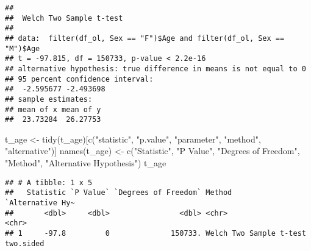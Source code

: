 \documentclass[
]{article}
\newenvironment{Shaded}{\begin{snugshade}}{\end{snugshade}}
\newcommand{\FunctionTok}[1]{\textcolor[rgb]{0.00,0.00,0.00}{#1}}
\newcommand{\NormalTok}[1]{#1}
\newcommand{\OtherTok}[1]{\textcolor[rgb]{0.56,0.35,0.01}{#1}}
\newcommand{\SpecialCharTok}[1]{\textcolor[rgb]{0.00,0.00,0.00}{#1}}
\newcommand{\StringTok}[1]{\textcolor[rgb]{0.31,0.60,0.02}{#1}}
\begin{document}
\begin{verbatim}
## 
##  Welch Two Sample t-test
## 
## data:  filter(df_ol, Sex == "F")$Age and filter(df_ol, Sex == "M")$Age
## t = -97.815, df = 150733, p-value < 2.2e-16
## alternative hypothesis: true difference in means is not equal to 0
## 95 percent confidence interval:
##  -2.595677 -2.493698
## sample estimates:
## mean of x mean of y 
##  23.73284  26.27753
\end{verbatim}

\begin{Shaded}
\begin{Highlighting}[]
\NormalTok{t\_age }\OtherTok{\textless{}{-}} \FunctionTok{tidy}\NormalTok{(t\_age)[}\FunctionTok{c}\NormalTok{(}\StringTok{"statistic"}\NormalTok{, }\StringTok{"p.value"}\NormalTok{, }\StringTok{"parameter"}\NormalTok{, }\StringTok{"method"}\NormalTok{, }\StringTok{"alternative"}\NormalTok{)]}
\FunctionTok{names}\NormalTok{(t\_age) }\OtherTok{\textless{}{-}} \FunctionTok{c}\NormalTok{(}\StringTok{"Statistic"}\NormalTok{, }\StringTok{"P Value"}\NormalTok{, }\StringTok{"Degrees of Freedom"}\NormalTok{, }\StringTok{"Method"}\NormalTok{, }\StringTok{"Alternative Hypothesis"}\NormalTok{)}
\NormalTok{t\_age}
\end{Highlighting}
\end{Shaded}

\begin{verbatim}
## # A tibble: 1 x 5
##   Statistic `P Value` `Degrees of Freedom` Method                  `Alternative Hy~
##       <dbl>     <dbl>                <dbl> <chr>                   <chr>           
## 1     -97.8         0              150733. Welch Two Sample t-test two.sided
\end{verbatim}

\begin{Shaded}
\end{Shaded}
\end{document}
